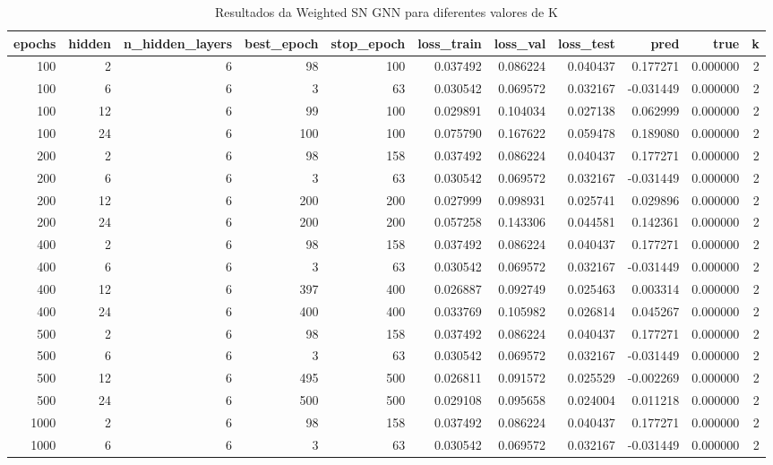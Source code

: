 \begin{table}
\caption{Resultados da Weighted SN GNN para diferentes valores de K}
\label{tab:weighted_gnn_results_all_k}
\begin{tabular}{rrrrrrrrrrr}
\toprule
epochs & hidden & n\_hidden\_layers & best\_epoch & stop\_epoch & loss\_train & loss\_val & loss\_test & pred & true & k \\
\midrule
100 & 2 & 6 & 98 & 100 & 0.037492 & 0.086224 & 0.040437 & 0.177271 & 0.000000 & 2 \\
100 & 6 & 6 & 3 & 63 & 0.030542 & 0.069572 & 0.032167 & -0.031449 & 0.000000 & 2 \\
100 & 12 & 6 & 99 & 100 & 0.029891 & 0.104034 & 0.027138 & 0.062999 & 0.000000 & 2 \\
100 & 24 & 6 & 100 & 100 & 0.075790 & 0.167622 & 0.059478 & 0.189080 & 0.000000 & 2 \\
200 & 2 & 6 & 98 & 158 & 0.037492 & 0.086224 & 0.040437 & 0.177271 & 0.000000 & 2 \\
200 & 6 & 6 & 3 & 63 & 0.030542 & 0.069572 & 0.032167 & -0.031449 & 0.000000 & 2 \\
200 & 12 & 6 & 200 & 200 & 0.027999 & 0.098931 & 0.025741 & 0.029896 & 0.000000 & 2 \\
200 & 24 & 6 & 200 & 200 & 0.057258 & 0.143306 & 0.044581 & 0.142361 & 0.000000 & 2 \\
400 & 2 & 6 & 98 & 158 & 0.037492 & 0.086224 & 0.040437 & 0.177271 & 0.000000 & 2 \\
400 & 6 & 6 & 3 & 63 & 0.030542 & 0.069572 & 0.032167 & -0.031449 & 0.000000 & 2 \\
400 & 12 & 6 & 397 & 400 & 0.026887 & 0.092749 & 0.025463 & 0.003314 & 0.000000 & 2 \\
400 & 24 & 6 & 400 & 400 & 0.033769 & 0.105982 & 0.026814 & 0.045267 & 0.000000 & 2 \\
500 & 2 & 6 & 98 & 158 & 0.037492 & 0.086224 & 0.040437 & 0.177271 & 0.000000 & 2 \\
500 & 6 & 6 & 3 & 63 & 0.030542 & 0.069572 & 0.032167 & -0.031449 & 0.000000 & 2 \\
500 & 12 & 6 & 495 & 500 & 0.026811 & 0.091572 & 0.025529 & -0.002269 & 0.000000 & 2 \\
500 & 24 & 6 & 500 & 500 & 0.029108 & 0.095658 & 0.024004 & 0.011218 & 0.000000 & 2 \\
1000 & 2 & 6 & 98 & 158 & 0.037492 & 0.086224 & 0.040437 & 0.177271 & 0.000000 & 2 \\
1000 & 6 & 6 & 3 & 63 & 0.030542 & 0.069572 & 0.032167 & -0.031449 & 0.000000 & 2 \\

\end{tabular}
\end{table}
